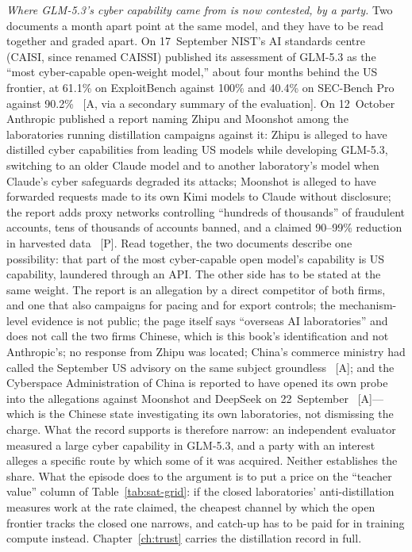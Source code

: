 \emph{Where GLM-5.3's cyber capability came from is now contested, by a party.} Two documents a month apart point at the same model, and they have to be read together and graded apart. On 17~September NIST's AI standards centre (CAISI, since renamed CAISSI) published its assessment of GLM-5.3 as the ``most cyber-capable open-weight model,'' about four months behind the US frontier, at 61.1\% on ExploitBench against 100\% and 40.4\% on SEC-Bench Pro against 90.2\%~\cite{mdl-caissi-glm53} [A, via a secondary summary of the evaluation]. On 12~October Anthropic published a report naming Zhipu and Moonshot among the laboratories running distillation campaigns against it: Zhipu is alleged to have distilled cyber capabilities from leading US models while developing GLM-5.3, switching to an older Claude model and to another laboratory's model when Claude's cyber safeguards degraded its attacks; Moonshot is alleged to have forwarded requests made to its own Kimi models to Claude without disclosure; the report adds proxy networks controlling ``hundreds of thousands'' of fraudulent accounts, tens of thousands of accounts banned, and a claimed 90--99\% reduction in harvested data~\cite{mdl-anthropic-distill-oct} [P]. Read together, the two documents describe one possibility: that part of the most cyber-capable open model's capability is US capability, laundered through an API. The other side has to be stated at the same weight. The report is an allegation by a direct competitor of both firms, and one that also campaigns for pacing and for export controls; the mechanism-level evidence is not public; the page itself says ``overseas AI laboratories'' and does not call the two firms Chinese, which is this book's identification and not Anthropic's; no response from Zhipu was located; China's commerce ministry had called the September US advisory on the same subject groundless~\cite{cisa-distillation,mdl-china-rejects-pacing} [A]; and the Cyberspace Administration of China is reported to have opened its own probe into the allegations against Moonshot and DeepSeek on 22~September~\cite{mdl-moonshot-wiki} [A]---which is the Chinese state investigating its own laboratories, not dismissing the charge. What the record supports is therefore narrow: an independent evaluator measured a large cyber capability in GLM-5.3, and a party with an interest alleges a specific route by which some of it was acquired. Neither establishes the share. What the episode does to the argument is to put a price on the ``teacher value'' column of Table~\ref{tab:sat-grid}: if the closed laboratories' anti-distillation measures work at the rate claimed, the cheapest channel by which the open frontier tracks the closed one narrows, and catch-up has to be paid for in training compute instead. Chapter~\ref{ch:trust} carries the distillation record in full.

